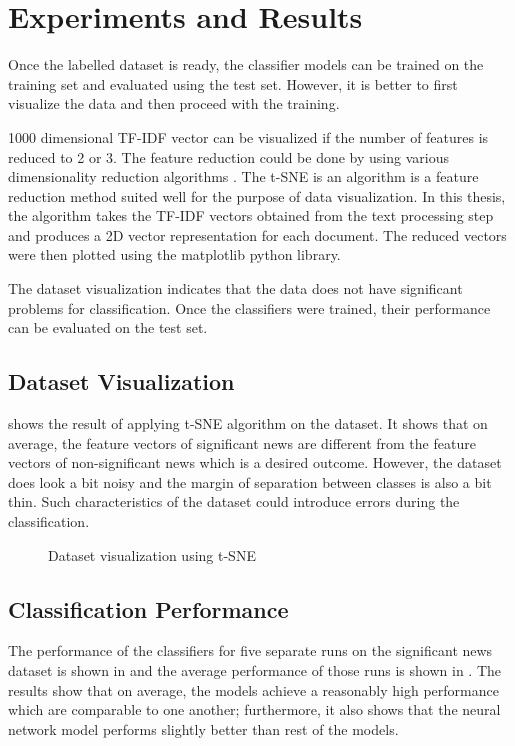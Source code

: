 \chapter{Experiments and Results} \label{result}
Once the labelled dataset is ready, the classifier models can be trained on the training set and evaluated using the test set. However, it is better to first visualize the data and then proceed with the training.

1000 dimensional TF-IDF vector can be visualized if the number of features is reduced to 2 or 3. The feature reduction could be done by using various dimensionality reduction algorithms \cite{tenenbaum2000global, roweis2000nonlinear}. The t-SNE\cite{maaten2008visualizing} is an algorithm  is a feature reduction method suited well for the purpose of data visualization. In this thesis, the algorithm takes the TF-IDF vectors obtained from the text processing step and produces a 2D vector representation for each document. The reduced vectors were then plotted using the matplotlib\cite{hunter2007matplotlib} python library.

The dataset visualization indicates that the data does not have significant problems for classification.  Once the classifiers were trained, their performance can be evaluated on the test set.

\section{Dataset Visualization}
 shows the result of applying t-SNE algorithm on the dataset. It shows that on average, the feature vectors of significant news are different from the feature vectors of non-significant news which is a desired outcome. However, the dataset does look a bit noisy and the margin of separation between classes is also a bit thin. Such characteristics of the dataset could introduce errors during the classification.

\begin{figure}[h]
    \caption{Dataset visualization using t-SNE}
    \label{fig:dataset}
\end{figure}

\section{Classification Performance}
The performance of the classifiers for five separate runs on the significant news dataset is shown in  and the average performance of those runs is shown in . The results show that on average, the models achieve a reasonably high performance which are comparable to one another; furthermore, it also shows that the neural network model performs slightly better than rest of the models.

